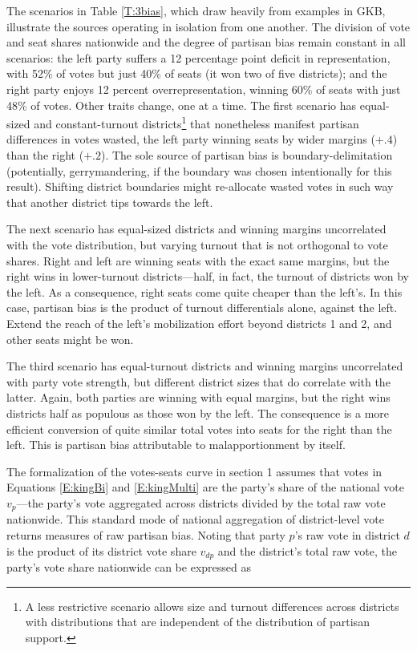 \documentclass[letter,12pt]{article}
\begin{document}
The scenarios in Table \ref{T:3bias}, which draw heavily from examples in GKB, illustrate the sources operating in isolation from one another. The division of vote and seat shares nationwide and the degree of partisan bias remain constant in all scenarios: the left party suffers a 12 percentage point deficit in representation, with 52\% of votes but just 40\% of seats (it won two of five districts); and the right party enjoys 12 percent overrepresentation, winning 60\% of seats with just 48\% of votes. Other traits change, one at a time. The first scenario has equal-sized and constant-turnout districts\footnote{A less restrictive scenario allows size and turnout differences across districts with distributions that are independent of the distribution of partisan support.} that nonetheless manifest partisan differences in votes wasted, the left party winning seats by wider margins ($+.4$) than the right ($+.2$). The sole source of partisan bias is boundary-delimitation (potentially, gerrymandering, if the boundary was chosen intentionally for this result). Shifting district boundaries might re-allocate wasted votes in such way that another district tips towards the left. 

The next scenario has equal-sized districts and winning margins uncorrelated with the vote distribution, but varying turnout that is not orthogonal to vote shares. Right and left are winning seats with the exact same margins, but the right wins in lower-turnout districts---half, in fact, the turnout of districts won by the left. As a consequence, right seats come quite cheaper than the left's. In this case, partisan bias is the product of turnout differentials alone, against the left. Extend the reach of the left's mobilization effort beyond districts 1 and 2, and other seats might be won. 

The third scenario has equal-turnout districts and winning margins uncorrelated with party vote strength, but different district sizes that do correlate with the latter. Again, both parties are winning with equal margins, but the right wins districts half as populous as those won by the left. The consequence is a more efficient conversion of quite similar total votes into seats for the right than the left. This is partisan bias attributable to malapportionment by itself.

The formalization of the votes-seats curve in section 1 assumes that votes in Equations \ref{E:kingBi} and \ref{E:kingMulti} are the party's share of the national vote $v_p$---the party's vote aggregated across districts divided by the total raw vote nationwide. This standard mode of national aggregation of district-level vote returns measures of raw partisan bias. Noting that party $p$'s raw vote in district $d$ is the product of its district vote share $v_{dp}$ and the district's total raw vote, the party's vote share nationwide can be expressed as 
\end{document}
